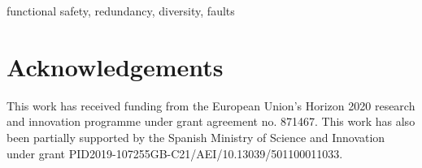 \documentclass[journal]{IEEEtran}
\begin{document}
\begin{IEEEkeywords}
functional safety, redundancy, diversity, faults
\end{IEEEkeywords}











\color{black}


\section*{Acknowledgements}
This work has received funding from the European Union's Horizon 2020 research and innovation programme under grant agreement no. 871467. 
This work has also been partially supported by the Spanish Ministry of Science and Innovation under grant PID2019-107255GB-C21/AEI/10.13039/501100011033.




\end{document}
